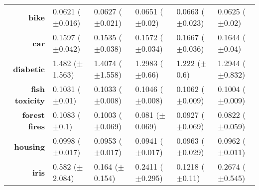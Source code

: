 \begin{table}[htb]
{\begin{tabular}{r|lllll}
                  \textbf{bike}                & \cellcolor[rgb]{ .388,  .745,  .482}0.0621 ($\pm$0.016)     & \cellcolor[rgb]{ 1,  .922,  .518}0.0627 ($\pm$0.021)    & \cellcolor[rgb]{ .984,  .584,  .455}0.0651 ($\pm$0.02)  & \cellcolor[rgb]{ .973,  .412,  .42}0.0663 ($\pm$0.023) & \cellcolor[rgb]{ .765,  .851,  .502}0.0625 ($\pm$0.02)  \\
                  \textbf{car}                 & \cellcolor[rgb]{ 1,  .922,  .518}0.1597 ($\pm$0.042)        & \cellcolor[rgb]{ .388,  .745,  .482}0.1535 ($\pm$0.038) & \cellcolor[rgb]{ .749,  .847,  .502}0.1572 ($\pm$0.034) & \cellcolor[rgb]{ .973,  .412,  .42}0.1667 ($\pm$0.036) & \cellcolor[rgb]{ .984,  .58,  .455}0.1644 ($\pm$0.04)   \\
                  \textbf{diabetic}            & \cellcolor[rgb]{ .973,  .412,  .42}1.482 ($\pm$1.563)       & \cellcolor[rgb]{ .984,  .62,  .463}1.4074 ($\pm$1.558)  & \cellcolor[rgb]{ 1,  .922,  .518}1.2983 ($\pm$0.66)     & \cellcolor[rgb]{ .388,  .745,  .482}1.222 ($\pm$0.6)   & \cellcolor[rgb]{ .969,  .91,  .514}1.2944 ($\pm$0.832)  \\
                  \textbf{fish toxicity}       & \cellcolor[rgb]{ .961,  .91,  .514}0.1031 ($\pm$0.01)       & \cellcolor[rgb]{ 1,  .922,  .518}0.1033 ($\pm$0.008)    & \cellcolor[rgb]{ .988,  .694,  .475}0.1046 ($\pm$0.008) & \cellcolor[rgb]{ .973,  .412,  .42}0.1062 ($\pm$0.009) & \cellcolor[rgb]{ .388,  .745,  .482}0.1004 ($\pm$0.009) \\
                  \textbf{forest fires}        & \cellcolor[rgb]{ .973,  .412,  .42}0.1083 ($\pm$0.1)        & \cellcolor[rgb]{ .988,  .675,  .471}0.1003 ($\pm$0.069) & \cellcolor[rgb]{ .388,  .745,  .482}0.081 ($\pm$0.069)  & \cellcolor[rgb]{ 1,  .922,  .518}0.0927 ($\pm$0.069)   & \cellcolor[rgb]{ .451,  .761,  .482}0.0822 ($\pm$0.059) \\
                  \textbf{housing}             & \cellcolor[rgb]{ .973,  .412,  .42}0.0998 ($\pm$0.017)      & \cellcolor[rgb]{ .745,  .847,  .502}0.0953 ($\pm$0.017) & \cellcolor[rgb]{ .388,  .745,  .482}0.0941 ($\pm$0.017) & \cellcolor[rgb]{ 1,  .918,  .518}0.0963 ($\pm$0.029)   & \cellcolor[rgb]{ 1,  .922,  .518}0.0962 ($\pm$0.011)    \\
                  \textbf{iris}                & \cellcolor[rgb]{ .973,  .412,  .42}0.582 ($\pm$2.084)       & \cellcolor[rgb]{ .604,  .804,  .494}0.164 ($\pm$0.154)  & \cellcolor[rgb]{ 1,  .922,  .518}0.2411 ($\pm$0.295)    & \cellcolor[rgb]{ .388,  .745,  .482}0.1218 ($\pm$0.11) & \cellcolor[rgb]{ 1,  .882,  .514}0.2674 ($\pm$0.545)    \\

\end{tabular}}
\end{table}
